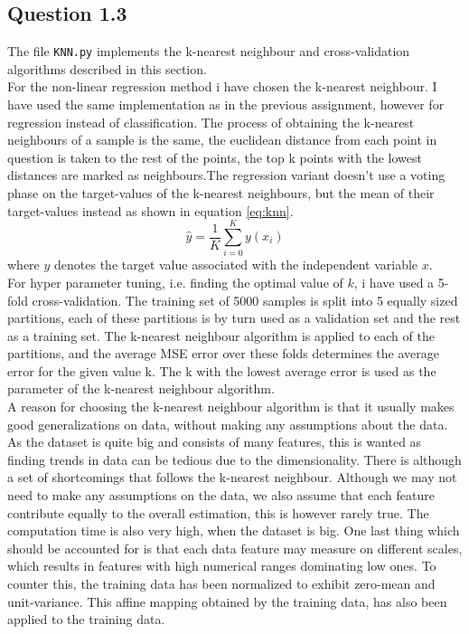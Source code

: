 \documentclass{article}
\begin{document}
\subsection{Question 1.3}
The file \texttt{KNN.py} implements the k-nearest neighbour and cross-validation algorithms described in this section.
\\
For the non-linear regression method i have chosen the k-nearest neighbour. I have used the same implementation as in the previous assignment, however for regression instead of classification. The process of obtaining the k-nearest neighbours of a sample is the same, the euclidean distance from each point in question is taken to the rest of the points, the top k points with the lowest distances are marked as neighbours.The regression variant doesn't use a voting phase 
on the target-values of the k-nearest neighbours, but the mean of their target-values instead as shown in equation \eqref{eq:knn}.
\begin{equation}
\hat{y} =  \dfrac{1}{K} \sum\limits_{i=0}^K y(x_i)
\label{eq:knn}
\end{equation}
where $y$ denotes the target value associated with the independent variable $x$. \\
For hyper parameter tuning, i.e. finding the optimal value of $k$, i have used a 5-fold cross-validation. The training set of 5000 samples is split into 5 equally sized partitions, each of these partitions is by turn used as a validation set and the rest as a training set. The k-nearest neighbour algorithm is applied to each of the partitions, and the average MSE error over these folds determines the average error for the given value k. The k with the lowest average error is used as the parameter of the k-nearest neighbour algorithm.
\\
A reason for choosing the k-nearest neighbour algorithm is that it usually makes good generalizations on data, without making any assumptions about the data. As the dataset is quite big and consists of many features, this is wanted as finding trends in data can be tedious due to the dimensionality. There is although a set of shortcomings that follows the k-nearest neighbour. Although we may not need to make any assumptions on the data, we also assume that each feature contribute equally to the overall estimation, this is however rarely true. The computation time is also very high, when the dataset is big. One last thing which should be accounted for is that each data feature may measure on different scales, which results in features with high numerical ranges dominating low ones. To counter this, the training data has been normalized to exhibit zero-mean and unit-variance. This affine mapping obtained by the training data, has also been applied to the training data. \\
\end{document}
